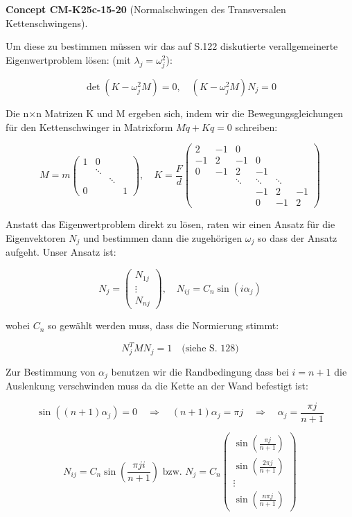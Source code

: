 \documentclass[10pt, letterpaper]{article}
\newcommand{\CustomHeading}[3]{%
  \par\medskip\noindent%
  \textbf{#1 #2} \textnormal{(#3)}.\enskip%
}
\newenvironment{CONC}[2]{\begin{unitbox}\CustomHeading{Concept}{#1}{#2}}{\end{unitbox}}
\begin{document}
\begin{CONC}{CM-K25c-15-20}{Normalschwingen des Transversalen Kettenschwingens}
Um diese zu bestimmen müssen wir das auf S.122 diskutierte verallgemeinerte Eigenwertproblem lösen: (mit $\lambda_j = \omega_j^2$):

\[
\det(K-\omega_j^2M) = 0, \quad (K-\omega_j^2M)N_j = 0
\]

Die n×n Matrizen K und M ergeben sich, indem wir die Bewegungsgleichungen für den Kettenschwinger in Matrixform $M\ddot{q}+Kq=0$ schreiben:

\[
M = m\begin{pmatrix}
1 & 0 & & \\
& \ddots & & \\
& & \ddots & \\
0 & & & 1
\end{pmatrix}, \quad
K = \frac{F}{d}\begin{pmatrix}
2 & -1 & 0 & & & \\
-1 & 2 & -1 & 0 & & \\
0 & -1 & 2 & -1 & & \\
& & \ddots & \ddots & \ddots & \\
& & & -1 & 2 & -1 \\
& & & 0 & -1 & 2
\end{pmatrix}
\]

Anstatt das Eigenwertproblem direkt zu lösen, raten wir einen Ansatz für die Eigenvektoren $N_j$ und bestimmen dann die zugehörigen $\omega_j$ so dass der Ansatz aufgeht. Unser Ansatz ist:

\[
N_j = \begin{pmatrix}
N_{1j} \\
\vdots \\
N_{nj}
\end{pmatrix}, \quad N_{ij} = C_n \sin(i\alpha_j)
\]

wobei $C_n$ so gewählt werden muss, dass die Normierung stimmt:

\[
N_j^T M N_j = 1 \quad \text{(siehe S. 128)}
\]

Zur Bestimmung von $\alpha_j$ benutzen wir die Randbedingung dass bei $i=n+1$ die Auslenkung verschwinden muss da die Kette an der Wand befestigt ist:

\[
\sin((n+1)\alpha_j) = 0 \quad \Rightarrow \quad (n+1)\alpha_j = \pi j \quad \Rightarrow \quad \alpha_j = \frac{\pi j}{n+1}
\]


\[
N_{ij} = C_n \sin\left(\frac{\pi j i}{n+1}\right) \text{ bzw. } N_j = C_n \begin{pmatrix}
\sin\left(\frac{\pi j}{n+1}\right) \\
\sin\left(\frac{2\pi j}{n+1}\right) \\
\vdots \\
\sin\left(\frac{n\pi j}{n+1}\right)
\end{pmatrix}
\]


\end{CONC}
\end{document}
